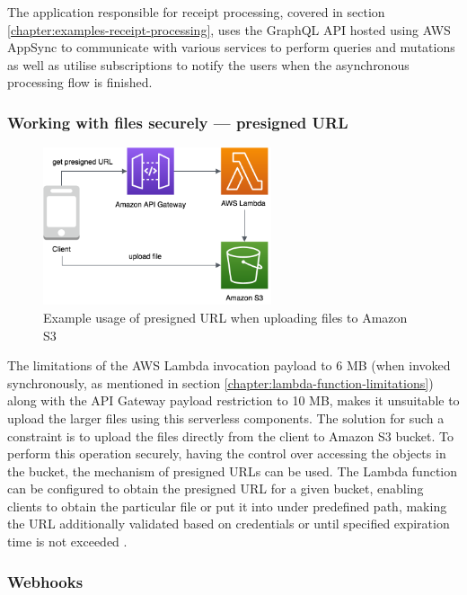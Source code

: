 The application responsible for receipt processing, covered in section \ref{chapter:examples-receipt-processing}, uses the GraphQL API hosted using AWS AppSync to communicate with various services to perform queries and mutations as well as utilise subscriptions to notify the users when the asynchronous processing flow is finished.

\subsubsection{Working with files securely --- presigned URL} \label{chapter:client-presigned-urls}

\begin{figure}[]
   \centering
   \includegraphics[width=0.6\textwidth]{assets/04-serverless-for-web-apps/presignedURL.png}
   \caption{Example usage of presigned URL when uploading files to Amazon S3}
   \label{fig:pattern-presigned-url}
\end{figure}

The limitations of the AWS Lambda invocation payload to 6 MB (when invoked synchronously, as mentioned in section \ref{chapter:lambda-function-limitations}) along with the API Gateway payload restriction to 10 MB, makes it unsuitable to upload the larger files using this serverless components.
The solution for such a constraint is to upload the files directly from the client to Amazon S3 bucket.
To perform this operation securely, having the control over accessing the objects in the bucket, the mechanism of presigned URLs can be used.
The Lambda function can be configured to obtain the presigned URL for a given bucket, enabling clients to obtain the particular file or put it into under predefined path, making the URL additionally validated based on credentials or until specified expiration time is not exceeded \cite{ServerlessAtScaleDesignPatternsAndOptimizations}.

\subsubsection{Webhooks} \label{chapter:client-webhooks}

